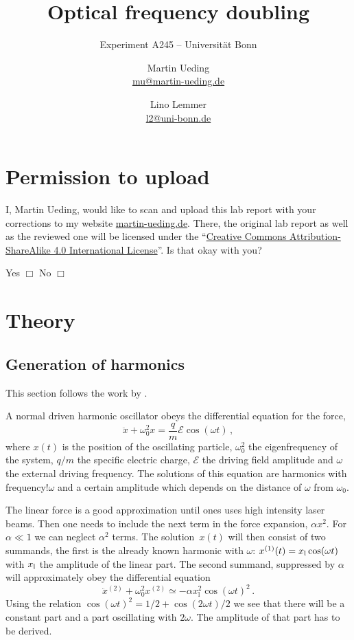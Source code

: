 \documentclass[11pt, english, fleqn, DIV=15, headinclude, BCOR=2cm]{scrreprt}
\title{Optical frequency doubling}
\subtitle{Experiment A245 -- Universität Bonn}
\author{%
    Martin Ueding \\
    \small{\href{mailto:mu@martin-ueding.de}{mu@martin-ueding.de}}
    \and
    Lino Lemmer \\
    \small{\href{mailto:l2@uni-bonn.de}{l2@uni-bonn.de}}
}
\date{\daterange{2016-05-23}{2016-05-24}}
\begin{document}
\maketitle

\begin{abstract}
\end{abstract}

\tableofcontents

\chapter*{Permission to upload}

I, Martin Ueding, would like to scan and upload this lab report with your
corrections to my website \href{http://martin-ueding.de}{martin-ueding.de}.
There, the original lab report as well as the reviewed one will be licensed
under the “\href{http://creativecommons.org/licenses/by-sa/4.0/}{Creative
Commons Attribution-ShareAlike 4.0 International License}”. Is that okay with
you?

Yes $\Box$ \hspace{2cm} No $\Box$

\chapter{Theory}

\section{Generation of harmonics}

This section follows the work by
\textcite[Chapter~12]{meschede/optik_licht_laser/2008}.

A normal driven harmonic oscillator obeys the differential equation for the
force,
\[
    \ddot x + \omega_0^2 x = \frac qm \mathcal E \cos(\omega t) \,,
\]
where $x(t)$ is the position of the oscillating particle, $\omega_0^2$ the
eigenfrequency of the system, $q/m$ the specific electric charge, $\mathcal E$
the driving field amplitude and $\omega$ the external driving frequency. The
solutions of this equation are harmonics with frequency!$\omega$ and a certain
amplitude which depends on the distance of $\omega$ from $\omega_0$.

The linear force is a good approximation until ones uses high intensity laser
beams. Then one needs to include the next term in the force expansion, $\alpha
x^2$. For $\alpha \ll 1$ we can neglect $\alpha^2$ terms. The solution~$x(t)$
will then consist of two summands, the first is the already known harmonic with
$\omega$: $x^{(1)}(t) = x_\text l \cos(\omega t)$ with $x_\text l$ the
amplitude of the linear part. The second summand, suppressed by $\alpha$ will
approximately obey the differential equation
\[
    \ddot x^{(2)} + \omega_0^2 x^{(2)} \simeq - \alpha x_\mathrm l^2
    \cos(\omega t)^2 \,.
\]
Using the relation $\cos(\omega t)^2 = 1/2 + \cos(2 \omega t)/2$ we see that
there will be a constant part and a part oscillating with $2 \omega$. The
amplitude of that part has to be derived.
\end{document}
